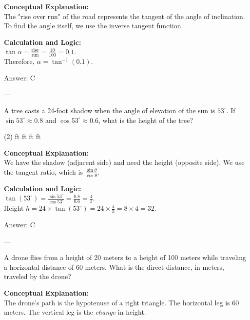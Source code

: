 \documentclass[11pt,paper=a4,answers]{exam}
\begin{document}
\begin{questions}
\begin{solution}
\textbf{Conceptual Explanation:} \\
The "rise over run" of the road represents the tangent of the angle of inclination. To find the angle itself, we use the inverse tangent function.

\vspace{10pt}
\textbf{Calculation and Logic:} \\
$\tan \alpha = \frac{\text{rise}}{\text{run}} = \frac{10}{100} = 0.1$. \\
Therefore, $\alpha = \tan^{-1}(0.1)$.

\vspace{15pt}
Answer: \colorbox{yellow!100}{C}
\end{solution}

---

\question
A tree casts a 24-foot shadow when the angle of elevation of the sun is $53^\circ$. If $\sin 53^\circ \approx 0.8$ and $\cos 53^\circ \approx 0.6$, what is the height of the tree?
\begin{tasks}(2)
     ft
     ft
     ft
     ft
\end{tasks}

\begin{solution}
\textbf{Conceptual Explanation:} \\
We have the shadow (adjacent side) and need the height (opposite side). We use the tangent ratio, which is $\frac{\sin \theta}{\cos \theta}$.

\vspace{10pt}
\textbf{Calculation and Logic:} \\
$\tan(53^\circ) = \frac{\sin 53^\circ}{\cos 53^\circ} = \frac{0.8}{0.6} = \frac{4}{3}$. \\
Height $h = 24 \times \tan(53^\circ) = 24 \times \frac{4}{3} = 8 \times 4 = 32$.

\vspace{15pt}
Answer: \colorbox{yellow!100}{C}
\end{solution}

---

\question
A drone flies from a height of 20 meters to a height of 100 meters while traveling a horizontal distance of 60 meters. What is the direct distance, in meters, traveled by the drone?

\begin{solution}
\textbf{Conceptual Explanation:} \\
The drone's path is the hypotenuse of a right triangle. The horizontal leg is 60 meters. The vertical leg is the \textit{change} in height.


\end{solution}
\end{questions}
\end{document}
